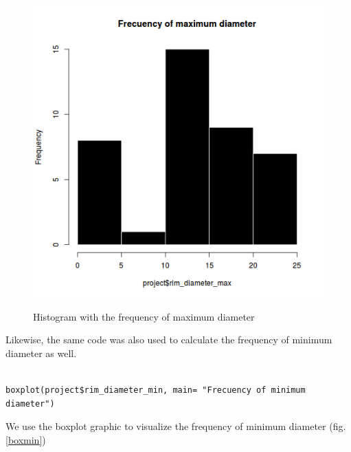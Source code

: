 \documentclass[10pt,a4paper]{article}
\begin{document}
\begin{figure}[hdp]
\centering
\includegraphics[scale=0.40]{histomax.png}
\label{histomax}
\caption{Histogram with the frequency of maximum diameter}
\end{figure} 

Likewise, the same code was also used to calculate the frequency of minimum diameter as well. 

\begin{verbatim}

boxplot(project$rim_diameter_min, main= "Frecuency of minimum diameter")

\end{verbatim}

We use the boxplot graphic to visualize the frequency of minimum diameter (fig. \ref{boxmin})
\end{document}
